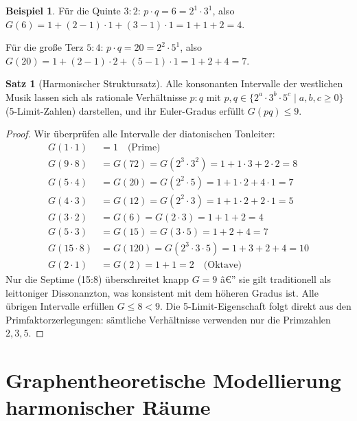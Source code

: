 ﻿\documentclass[a4paper,12pt]{article}
\theoremstyle{definition}
\newtheorem{beispiel}{Beispiel}
\newtheorem{satz}{Satz}
\begin{document}
\begin{beispiel}
Für die Quinte $3:2$: $p \cdot q = 6 = 2^1 \cdot 3^1$, also
$G(6) = 1 + (2-1)\cdot 1 + (3-1)\cdot 1 = 1 + 1 + 2 = 4$.

Für die große Terz $5:4$: $p \cdot q = 20 = 2^2 \cdot 5^1$, also
$G(20) = 1 + (2-1)\cdot 2 + (5-1)\cdot 1 = 1 + 2 + 4 = 7$.
\end{beispiel}

\begin{satz}[Harmonischer Struktursatz]
\label{satz:struktursatz}
Alle konsonanten Intervalle der westlichen Musik lassen sich als rationale Verhältnisse
$p:q$ mit $p,q \in \{2^a \cdot 3^b \cdot 5^c \mid a, b, c \geq 0\}$ (5-Limit-Zahlen)
darstellen, und ihr Euler-Gradus erfüllt $G(pq) \leq 9$.
\end{satz}

\begin{proof}
Wir überprüfen alle Intervalle der diatonischen Tonleiter:
\begin{align*}
G(1 \cdot 1) &= 1 \quad\text{(Prime)} \\
G(9 \cdot 8) &= G(72) = G(2^3 \cdot 3^2) = 1 + 1\cdot 3 + 2\cdot 2 = 8 \\
G(5 \cdot 4) &= G(20) = G(2^2 \cdot 5) = 1 + 1\cdot 2 + 4\cdot 1 = 7 \\
G(4 \cdot 3) &= G(12) = G(2^2 \cdot 3) = 1 + 1\cdot 2 + 2\cdot 1 = 5 \\
G(3 \cdot 2) &= G(6) = G(2 \cdot 3) = 1 + 1 + 2 = 4 \\
G(5 \cdot 3) &= G(15) = G(3 \cdot 5) = 1 + 2 + 4 = 7 \\
G(15\cdot 8) &= G(120) = G(2^3\cdot 3\cdot 5) = 1 + 3 + 2 + 4 = 10 \\
G(2 \cdot 1) &= G(2) = 1 + 1 = 2 \quad\text{(Oktave)}
\end{align*}
Nur die Septime (15:8) überschreitet knapp $G = 9$ â€” sie gilt traditionell als
leittoniger Dissonanzton, was konsistent mit dem höheren Gradus ist. Alle übrigen
Intervalle erfüllen $G \leq 8 < 9$. Die 5-Limit-Eigenschaft folgt direkt aus den
Primfaktorzerlegungen: sämtliche Verhältnisse verwenden nur die Primzahlen $2, 3, 5$.
\end{proof}

\section{Graphentheoretische Modellierung harmonischer Räume}
\end{document}
